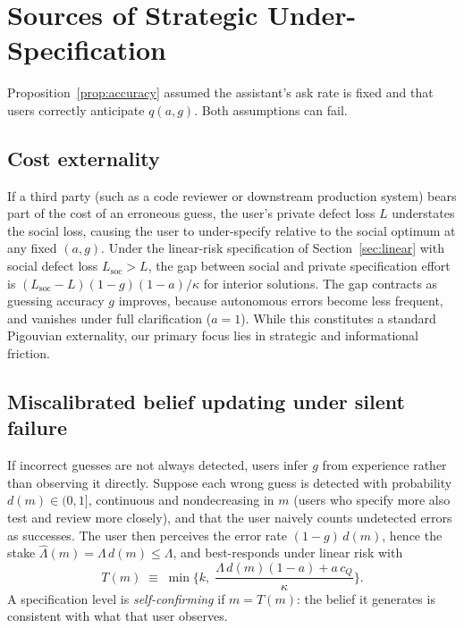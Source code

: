 \documentclass[11pt]{article}
\begin{document}
\section{Sources of Strategic Under-Specification}
\label{sec:sources}

Proposition~\ref{prop:accuracy} assumed the assistant's ask rate is fixed and that
users correctly anticipate $q(a,g)$. Both assumptions can fail.

\subsection{Cost externality}
If a third party (such as a code reviewer or downstream production system) bears part of the
cost of an erroneous guess, the user's private defect loss $L$ understates the social
loss, causing the user to under-specify relative to the social optimum at any fixed
$(a,g)$. Under the linear-risk specification of Section~\ref{sec:linear} with social defect loss $L_{\text{soc}} > L$, the gap between social
and private specification effort is $(L_{\text{soc}} - L)(1-g)(1-a)/\kappa$ for interior solutions. The gap contracts as
guessing accuracy $g$ improves, because autonomous errors become less frequent, and vanishes under full clarification ($a=1$). While this constitutes
a standard Pigouvian externality, our primary focus lies in strategic and informational friction.

\subsection{Miscalibrated belief updating under silent failure}
\label{sec:silent}
If incorrect guesses are not always detected, users infer $g$ from experience rather than observing it directly. Suppose each wrong guess is detected with probability $d(m) \in (0,1]$, continuous and nondecreasing in $m$ (users who specify more also test and review more closely), and that the user naively counts undetected errors as successes. The user then perceives the error rate $(1-g)\,d(m)$, hence the stake $\hat\Lambda(m) = \Lambda\, d(m) \le \Lambda$, and best-responds under linear risk with
\[
T(m) \;\equiv\; \min\Big\{k,\; \frac{\Lambda\, d(m)(1-a) + a\,c_Q}{\kappa}\Big\}.
\]
A specification level is \emph{self-confirming} if $m = T(m)$: the belief it generates is consistent with what that user observes.
\end{document}
